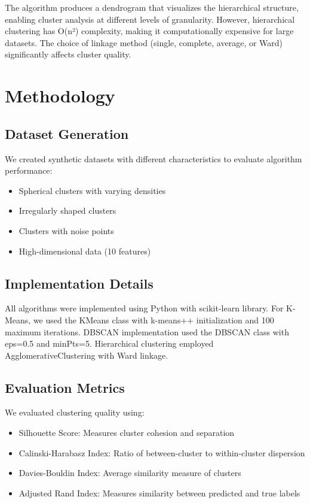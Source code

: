 \documentclass{COMPXXXX}
\begin{document}
The algorithm produces a dendrogram that visualizes the hierarchical structure, enabling cluster analysis at different levels of granularity. However, hierarchical clustering has O(n²) complexity, making it computationally expensive for large datasets. The choice of linkage method (single, complete, average, or Ward) significantly affects cluster quality.

\section{Methodology}

\subsection{Dataset Generation}
We created synthetic datasets with different characteristics to evaluate algorithm performance:
\begin{itemize}
    \item Spherical clusters with varying densities
    \item Irregularly shaped clusters
    \item Clusters with noise points
    \item High-dimensional data (10 features)
\end{itemize}

\subsection{Implementation Details}
All algorithms were implemented using Python with scikit-learn library. For K-Means, we used the KMeans class with k-means++ initialization and 100 maximum iterations. DBSCAN implementation used the DBSCAN class with eps=0.5 and minPts=5. Hierarchical clustering employed AgglomerativeClustering with Ward linkage.

\subsection{Evaluation Metrics}
We evaluated clustering quality using:
\begin{itemize}
    \item Silhouette Score: Measures cluster cohesion and separation
    \item Calinski-Harabasz Index: Ratio of between-cluster to within-cluster dispersion
    \item Davies-Bouldin Index: Average similarity measure of clusters
    \item Adjusted Rand Index: Measures similarity between predicted and true labels
\end{itemize}
\end{document}
